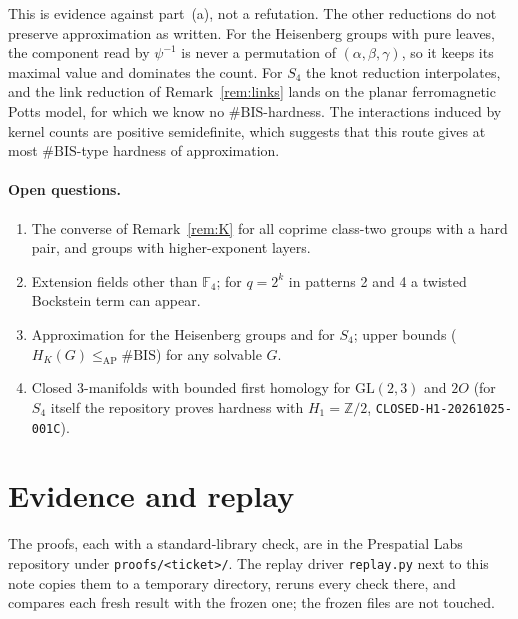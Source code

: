 \documentclass[11pt]{article}
\theoremstyle{definition}
\theoremstyle{remark}
\newcommand{\F}{\mathbb{F}}
\newcommand{\Z}{\mathbb{Z}}
\begin{document}
This is evidence against part~(a), not a refutation. The other reductions do
not preserve approximation as written. For the Heisenberg groups with pure
leaves, the component read by $\psi^{-1}$ is never a permutation of
$(\alpha,\beta,\gamma)$, so it keeps its maximal value and dominates the count.
For $S_4$ the knot reduction interpolates, and the link reduction of
Remark~\ref{rem:links} lands on the planar ferromagnetic Potts model, for which
we know no $\#\mathrm{BIS}$-hardness. The interactions induced by kernel counts
are positive semidefinite, which suggests that this route gives at most
$\#\mathrm{BIS}$-type hardness of approximation.

\paragraph{Open questions.}
\begin{enumerate}
\item The converse of Remark~\ref{rem:K} for all coprime class-two groups with
a hard pair, and groups with higher-exponent layers.
\item Extension fields other than $\F_4$; for $q=2^k$ in patterns 2 and 4 a
twisted Bockstein term can appear.
\item Approximation for the Heisenberg groups and for $S_4$; upper bounds
($H_K(G)\le_{\mathrm{AP}}\#\mathrm{BIS}$) for any solvable $G$.
\item Closed 3-manifolds with bounded first homology for $\mathrm{GL}(2,3)$
and $2O$ (for $S_4$ itself the repository proves hardness with $H_1=\Z/2$,
\texttt{CLOSED-H1-20261025-001C}).
\end{enumerate}

\section{Evidence and replay}\label{sec:evidence}

The proofs, each with a standard-library check, are in the Prespatial Labs
repository under \texttt{proofs/<ticket>/}. The replay driver
\texttt{replay.py} next to this note copies them to a temporary directory,
reruns every check there, and compares each fresh result with the frozen one;
the frozen files are not touched.
\end{document}
